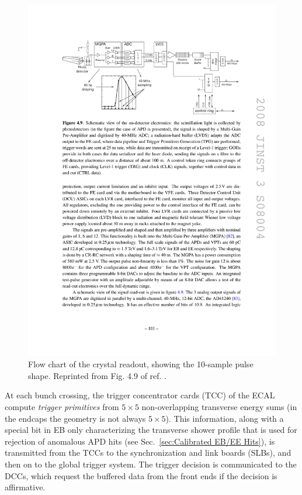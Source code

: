 \documentclass[dissertation.tex]{subfiles}
\begin{document}
\begin{figure}
	\centering
	\includegraphics[scale=1.0]{ECAL_readout}
	\caption{Flow chart of the crystal readout, showing the 10-sample pulse shape.  Reprinted from Fig. 4.9 of ref. \cite{1748-0221-3-08-S08004}.}
	\label{fig:ECAL_readout}
\end{figure}

At each bunch crossing, the trigger concentrator cards (TCC) of the ECAL compute \textit{trigger primitives} from $5\times5$ non-overlapping transverse energy sums (in the endcaps the geometry is not always $5\times5$).  This information, along with a special bit in EB only characterizing the transverse shower profile that is used for rejection of anomalous APD hits (see Sec.~\ref{sec:Calibrated EB/EE Hits}), is transmitted from the TCCs to the synchronization and link boards (SLBs), and then on to the global trigger system.  The trigger decision is communicated to the DCCs, which request the buffered data from the front ends if the decision is affirmative.
\end{document}
